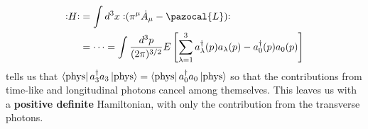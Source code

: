 \documentclass[../main.tex]{subfiles}
\begin{document}
\begin{align*}
\norder{H}&=\int d^3x \norder{(\pi^\mu\Dot{A}_\mu-\pazocal{L})}\\
&=\dots=\int\frac{d^3p}{(2\pi)^{3/2}}E\left[\sum_{\lambda=1}^3a_\lambda^\dagger(p)a_\lambda(p)-a^\dagger_0(p)a_0(p)\right]
\end{align*}
 tells us that $\bra{\text{phys}}a^\dagger_3a_3\ket{\text{phys}}=\bra{\text{phys}}a^\dagger_0a_0\ket{\text{phys}}$ so that the contributions from time-like and longitudinal photons cancel among themselves. This leaves us with a \textbf{positive definite} Hamiltonian, with only the contribution from the transverse photons.
\end{document}
